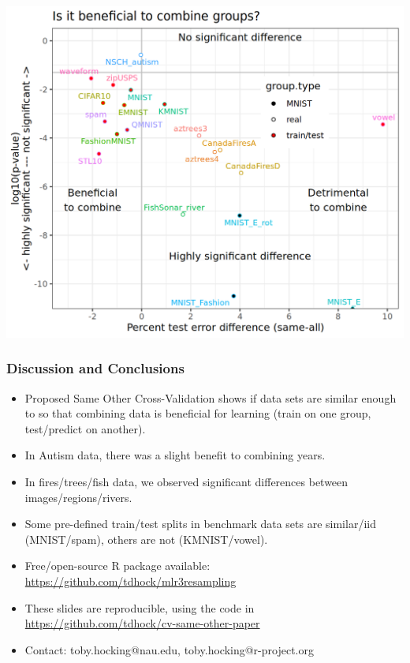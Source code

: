 \documentclass{beamer}
\begin{document}
\begin{frame}
  \includegraphics[height=\textheight]{data_Classif_batchmark_registry_scatter_all.png}
\end{frame}
 
\begin{frame}
  \frametitle{Discussion and Conclusions}
  \begin{itemize}
  \item Proposed Same Other Cross-Validation shows if
    data sets are similar enough to so that combining data is
    beneficial for learning (train on one group, test/predict on
    another).
  \item In Autism data, there was a slight benefit to combining years.
  \item In fires/trees/fish data, we observed
    significant differences between images/regions/rivers.
  \item Some pre-defined train/test splits in benchmark data sets
    are similar/iid (MNIST/spam), others are not (KMNIST/vowel).
  \item Free/open-source R package available:
    \url{https://github.com/tdhock/mlr3resampling}
  \item These slides are reproducible, using the code in \url{https://github.com/tdhock/cv-same-other-paper}
  \item Contact: toby.hocking@nau.edu,
    toby.hocking@r-project.org
  \end{itemize}
\end{frame}
\end{document}
